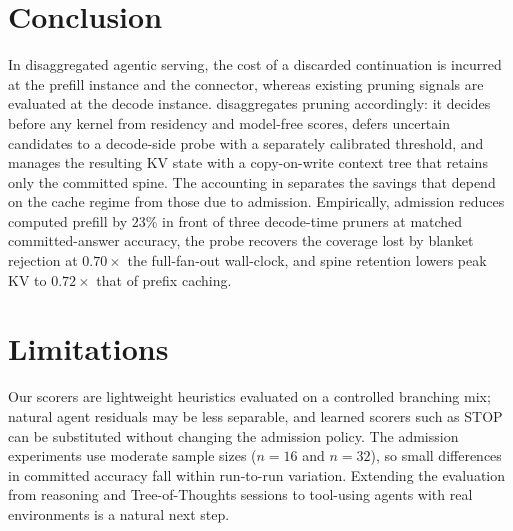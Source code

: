 \section{Conclusion}
\label{sec:conclusion}

In disaggregated agentic serving, the cost of a discarded continuation is incurred at the prefill instance and the connector, whereas existing pruning signals are evaluated at the decode instance.
\sys disaggregates pruning accordingly: it decides before any kernel from residency and model-free scores, defers uncertain candidates to a decode-side probe with a separately calibrated threshold, and manages the resulting KV state with a copy-on-write context tree that retains only the committed spine.
The accounting in  separates the savings that depend on the cache regime from those due to admission.
Empirically, admission reduces computed prefill by $23\%$ in front of three decode-time pruners at matched committed-answer accuracy, the probe recovers the coverage lost by blanket rejection at $0.70\times$ the full-fan-out wall-clock, and spine retention lowers peak KV to $0.72\times$ that of prefix caching.

\section*{Limitations}
\label{sec:limitations}

Our scorers are lightweight heuristics evaluated on a controlled branching mix; natural agent residuals may be less separable, and learned scorers such as STOP~\cite{stoploss} can be substituted without changing the admission policy.
The admission experiments use moderate sample sizes ($n{=}16$ and $n{=}32$), so small differences in committed accuracy fall within run-to-run variation.
Extending the evaluation from reasoning and Tree-of-Thoughts sessions to tool-using agents with real environments is a natural next step.

